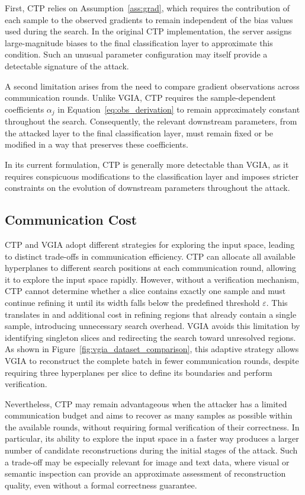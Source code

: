First, CTP relies on Assumption~\ref{ass:grad}, which requires the contribution of each sample to the observed gradients to remain independent of the bias values used during the search. In the original CTP implementation, the server assigns large-magnitude biases to the final classification layer to approximate this condition. Such an unusual parameter configuration may itself provide a detectable signature of the attack.

A second limitation arises from the need to compare gradient observations across communication rounds. Unlike VGIA, CTP requires the sample-dependent coefficients $\alpha_j$ in Equation~\eqref{eq:obs_derivation} to remain approximately constant throughout the search. Consequently, the relevant downstream parameters, from the attacked layer to the final classification layer, must remain fixed or be modified in a way that preserves these coefficients.

In its current formulation, CTP is generally more detectable than VGIA, as it requires conspicuous modifications to the classification layer and imposes stricter constraints on the evolution of downstream parameters throughout the attack.

\subsection{Communication Cost}

CTP and VGIA adopt different strategies for exploring the input space, leading to distinct trade-offs in communication efficiency. CTP can allocate all available hyperplanes to different search positions at each communication round, allowing it to explore the input space rapidly. However, without a verification mechanism, CTP cannot determine whether a slice contains exactly one sample and must continue refining it until its width falls below the predefined threshold $\varepsilon$. This translates in and additional cost in refining regions that already contain a single sample, introducing unnecessary search overhead. VGIA avoids this limitation by identifying singleton slices and redirecting the search toward unresolved regions. As shown in Figure~\ref{fig:vgia_dataset_comparison}, this adaptive strategy allows VGIA to reconstruct the complete batch in fewer communication rounds, despite requiring three hyperplanes per slice to define its boundaries and perform verification.

Nevertheless, CTP may remain advantageous when the attacker has a limited communication budget and aims to recover as many samples as possible within the available rounds, without requiring formal verification of their correctness. In particular, its ability to explore the input space in a faster way produces a larger number of candidate reconstructions during the initial stages of the attack. Such a trade-off may be especially relevant for image and text data, where visual or semantic inspection can provide an approximate assessment of reconstruction quality, even without a formal correctness guarantee.

